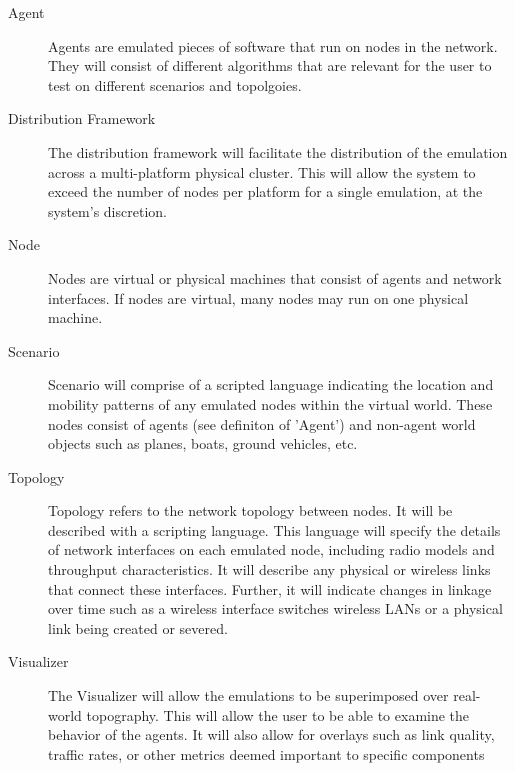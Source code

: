 \documentclass[titlepage]{article}
\begin{document}
\begin{description}
\item[Agent]
	Agents are emulated pieces of software that run on nodes in the network. They will consist of different algorithms that are relevant for the user to test on different scenarios and topolgoies.   

\item[Distribution Framework]
	The distribution framework will facilitate the distribution of the emulation across a multi-platform physical cluster.  This will allow the system to exceed the number of nodes per platform for a single emulation, at the system's discretion.

\item[Node]
	Nodes are virtual or physical machines that consist of agents and network interfaces.  If nodes are virtual, many nodes may run on one physical machine.  

\item[Scenario]
	Scenario will comprise of a scripted language indicating the location and mobility patterns of any emulated nodes within the virtual world. These nodes consist of agents (see definiton of 'Agent') and non-agent world objects such as planes, boats, ground vehicles, etc. 

\item[Topology]
	Topology refers to the network topology between nodes. It will be described with a scripting language.  This language will specify the details of network interfaces on each emulated node, including radio models and throughput characteristics.  It will describe any physical or wireless links that connect these interfaces.  Further, it will indicate changes in linkage over time such as a wireless interface switches wireless LANs or a physical link being created or severed. 

\item[Visualizer]
	The Visualizer will allow the emulations to be superimposed over real-world topography.  This will allow the user to be able to examine the behavior of the agents.  It will also allow for overlays such as link quality, traffic rates, or other metrics deemed important to specific components

\end{description}


\end{document}

